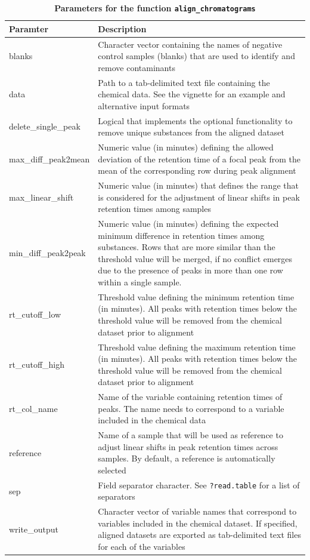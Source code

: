 \documentclass[10pt,letterpaper]{article}
\begin{document}
\begin{table}[!ht]
\begin{adjustwidth}{-2.25in}{0in} %
\centering
\caption{\textbf{Parameters for the function \texttt{align\_chromatograms}}}
\label{table:table1}
\begin{tabular}{|p{3.2cm}|p{9cm}|} 
\hline
\textbf{Paramter} & \textbf{Description} \\ \hline
blanks & Character vector containing the names of negative control samples (blanks) that are used to identify and remove contaminants \\
\hline
data & Path to a tab-delimited text file containing the chemical data. See the vignette for an example and alternative input formats \\
\hline
delete\_single\_peak & Logical that implements the optional functionality to remove unique substances from the aligned dataset \\
\hline
max\_diff\_peak2mean & Numeric value (in minutes) defining the allowed deviation of the retention time of a focal peak from the mean of the corresponding row during peak alignment \\
\hline
max\_linear\_shift & Numeric value (in minutes) that defines the range that is considered for the adjustment of linear shifts in peak retention times among samples \\
\hline
min\_diff\_peak2peak & Numeric value (in minutes) defining the expected minimum difference in retention times among substances. Rows that are more similar than the threshold value will be merged, if no conflict emerges due to the presence of peaks in more than one row within a single sample. \\
\hline
rt\_cutoff\_low & Threshold value defining the minimum retention time (in minutes). All peaks with retention times below the threshold value will be removed from the chemical dataset prior to alignment\\
\hline
rt\_cutoff\_high & Threshold value defining the maximum retention time (in minutes). All peaks with retention times below the threshold value will be removed from the chemical dataset prior to alignment\\
\hline
rt\_col\_name & Name of the variable containing retention times of peaks. The name needs to correspond to a variable included in the chemical data \\
\hline
reference & Name of a sample that will be used as reference to adjust linear shifts in peak retention times across samples. By default, a reference is automatically selected\\ 
\hline
sep & Field separator character. See \texttt{?read.table} for a list of separators\\
\hline
write\_output & Character vector of variable names that correspond to variables included in the chemical  dataset. If specified, aligned datasets are exported as tab-delimited text files for each of the variables\\
\hline
\end{tabular}
\end{adjustwidth}
\end{table}
\end{document}
